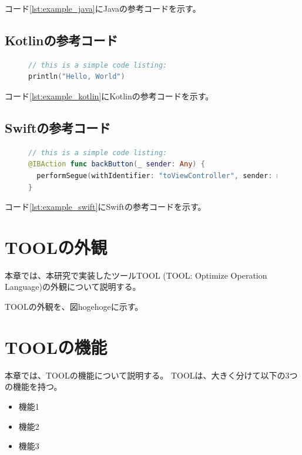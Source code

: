 \documentclass[uplatex, report, a4j, 10pt, dvipdfmx]{jsbook}
\newcommand{\tool}{TOOL}
\newcommand{\toolFullName}{TOOL: Optimize Operation Language}
\begin{document}
コード\ref{lst:example_java}にJavaの参考コードを示す。

\section{Kotlinの参考コード}

\begin{figure}[tp]
\begin{lstlisting}[caption={Kotlinの参考コード}, label={lst:example_kotlin}, language=Kotlin]
// this is a simple code listing:
println("Hello, World")
\end{lstlisting}
\end{figure}
コード\ref{lst:example_kotlin}にKotlinの参考コードを示す。

\section{Swiftの参考コード}

\begin{figure}[tp]
\begin{lstlisting}[caption={Swiftの参考コード}, label={lst:example_swift}, language=swift]
// this is a simple code listing:
@IBAction func backButton(_ sender: Any) {
  performSegue(withIdentifier: "toViewController", sender: nil)
}
\end{lstlisting}
\end{figure}
コード\ref{lst:example_swift}にSwiftの参考コードを示す。


\chapter{\tool{}の外観}\label{cha:Appearance}

本章では、本研究で実装したツール\tool{} (\toolFullName{})の外観について説明する。

\tool{}の外観を、図hogehogeに示す。


\chapter{\tool{}の機能}\label{cha:Function}

本章では、\tool{}の機能について説明する。
\tool{}は、大きく分けて以下の3つの機能を持つ。

\begin{itemize}
	\item 機能1
	\item 機能2
	\item 機能3
\end{itemize}
\end{document}
